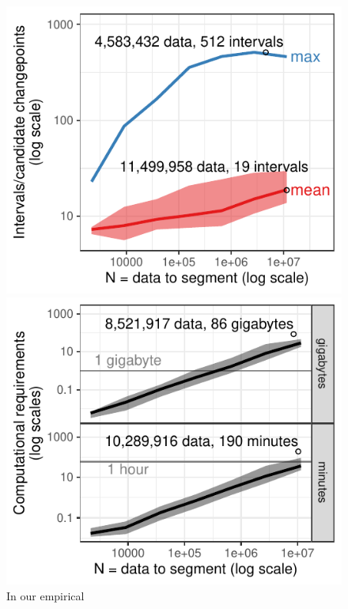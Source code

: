 \documentclass[article]{jss}
\begin{document}
\begin{figure}[t!]
\centering
\begin{minipage}{3.1in}
  \includegraphics{jss-figure-target-intervals-models}
\end{minipage} 
\begin{minipage}{3.1in}
  \includegraphics{jss-figure-target-intervals-models-computation}
\end{minipage}
\caption{\label{fig:target-intervals-models-all} In our empirical
}
\end{figure}
\end{document}
